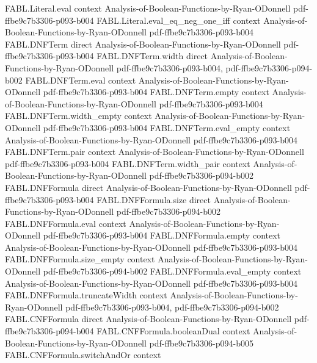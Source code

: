\begin{theorem}
\proofstep
  {FABL.Literal.eval}
  {context}
  {Analysis-of-Boolean-Functions-by-Ryan-ODonnell}
  {pdf-ffbe9c7b3306-p093-b004}
\proofstep
  {FABL.Literal.eval_eq_neg_one_iff}
  {context}
  {Analysis-of-Boolean-Functions-by-Ryan-ODonnell}
  {pdf-ffbe9c7b3306-p093-b004}
\proofstep
  {FABL.DNFTerm}
  {direct}
  {Analysis-of-Boolean-Functions-by-Ryan-ODonnell}
  {pdf-ffbe9c7b3306-p093-b004}
\proofstep
  {FABL.DNFTerm.width}
  {direct}
  {Analysis-of-Boolean-Functions-by-Ryan-ODonnell}
  {pdf-ffbe9c7b3306-p093-b004,
    pdf-ffbe9c7b3306-p094-b002}
\proofstep
  {FABL.DNFTerm.eval}
  {context}
  {Analysis-of-Boolean-Functions-by-Ryan-ODonnell}
  {pdf-ffbe9c7b3306-p093-b004}
\proofstep
  {FABL.DNFTerm.empty}
  {context}
  {Analysis-of-Boolean-Functions-by-Ryan-ODonnell}
  {pdf-ffbe9c7b3306-p093-b004}
\proofstep
  {FABL.DNFTerm.width_empty}
  {context}
  {Analysis-of-Boolean-Functions-by-Ryan-ODonnell}
  {pdf-ffbe9c7b3306-p093-b004}
\proofstep
  {FABL.DNFTerm.eval_empty}
  {context}
  {Analysis-of-Boolean-Functions-by-Ryan-ODonnell}
  {pdf-ffbe9c7b3306-p093-b004}
\proofstep
  {FABL.DNFTerm.pair}
  {context}
  {Analysis-of-Boolean-Functions-by-Ryan-ODonnell}
  {pdf-ffbe9c7b3306-p093-b004}
\proofstep
  {FABL.DNFTerm.width_pair}
  {context}
  {Analysis-of-Boolean-Functions-by-Ryan-ODonnell}
  {pdf-ffbe9c7b3306-p094-b002}
\proofstep
  {FABL.DNFFormula}
  {direct}
  {Analysis-of-Boolean-Functions-by-Ryan-ODonnell}
  {pdf-ffbe9c7b3306-p093-b004}
\proofstep
  {FABL.DNFFormula.size}
  {direct}
  {Analysis-of-Boolean-Functions-by-Ryan-ODonnell}
  {pdf-ffbe9c7b3306-p094-b002}
\proofstep
  {FABL.DNFFormula.eval}
  {context}
  {Analysis-of-Boolean-Functions-by-Ryan-ODonnell}
  {pdf-ffbe9c7b3306-p093-b004}
\proofstep
  {FABL.DNFFormula.empty}
  {context}
  {Analysis-of-Boolean-Functions-by-Ryan-ODonnell}
  {pdf-ffbe9c7b3306-p093-b004}
\proofstep
  {FABL.DNFFormula.size_empty}
  {context}
  {Analysis-of-Boolean-Functions-by-Ryan-ODonnell}
  {pdf-ffbe9c7b3306-p094-b002}
\proofstep
  {FABL.DNFFormula.eval_empty}
  {context}
  {Analysis-of-Boolean-Functions-by-Ryan-ODonnell}
  {pdf-ffbe9c7b3306-p093-b004}
\proofstep
  {FABL.DNFFormula.truncateWidth}
  {context}
  {Analysis-of-Boolean-Functions-by-Ryan-ODonnell}
  {pdf-ffbe9c7b3306-p093-b004,
    pdf-ffbe9c7b3306-p094-b002}
\proofstep
  {FABL.CNFFormula}
  {direct}
  {Analysis-of-Boolean-Functions-by-Ryan-ODonnell}
  {pdf-ffbe9c7b3306-p094-b004}
\proofstep
  {FABL.CNFFormula.booleanDual}
  {context}
  {Analysis-of-Boolean-Functions-by-Ryan-ODonnell}
  {pdf-ffbe9c7b3306-p094-b005}
\proofstep
  {FABL.CNFFormula.switchAndOr}
  {context}

\end{theorem}
